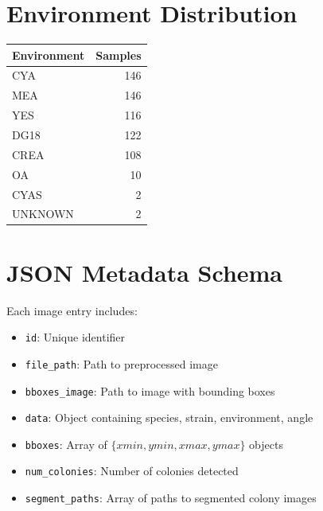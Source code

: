 \documentclass[11pt]{article}
\begin{document}
\section{Environment Distribution}
\begin{table}[H]
\centering
\begin{tabular}{lr}
\toprule
Environment & Samples \\
\midrule
CYA & 146 \\
MEA & 146 \\
YES & 116 \\
DG18 & 122 \\
CREA & 108 \\
OA & 10 \\
CYAS & 2 \\
UNKNOWN & 2 \\
\bottomrule
\end{tabular}
\end{table}

\section{JSON Metadata Schema}
Each image entry includes:
\begin{itemize}
\item \texttt{id}: Unique identifier
\item \texttt{file\_path}: Path to preprocessed image
\item \texttt{bboxes\_image}: Path to image with bounding boxes
\item \texttt{data}: Object containing species, strain, environment, angle
\item \texttt{bboxes}: Array of $\{xmin, ymin, xmax, ymax\}$ objects
\item \texttt{num\_colonies}: Number of colonies detected
\item \texttt{segment\_paths}: Array of paths to segmented colony images
\end{itemize}
\end{document}
